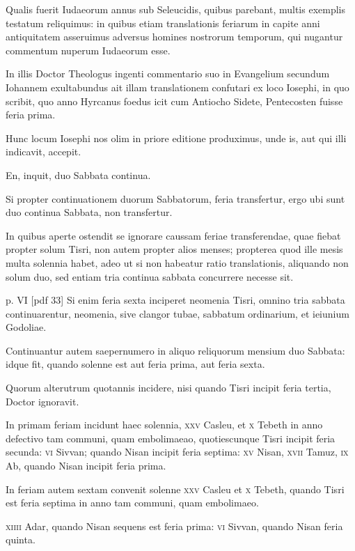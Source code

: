 \begin{parnumbers}
Qualis fuerit Iudaeorum annus sub Seleucidis, quibus parebant,
multis exemplis testatum reliquimus: in quibus etiam translationis
feriarum in capite anni antiquitatem asseruimus adversus homines
nostrorum temporum, qui nugantur commentum nuperum
Iudaeorum esse.

In illis Doctor Theologus ingenti commentario
suo in Evangelium secundum Iohannem exultabundus ait illam
translationem confutari ex loco Iosephi, in quo scribit, quo anno
Hyrcanus foedus icit cum Antiocho Sidete, Pentecosten fuisse feria
prima.

Hunc locum Iosephi nos olim in priore editione produximus,
unde is, aut qui illi indicavit, accepit.

En, inquit, duo Sabbata continua.

Si propter continuationem duorum Sabbatorum, feria transfertur,
ergo ubi sunt duo continua Sabbata, non transfertur. 

In quibus aperte ostendit se ignorare caussam feriae transferendae, quae fiebat
propter solum Tisri, non autem propter alios menses; propterea
quod ille mesis multa solennia habet, adeo ut si non habeatur
ratio translationis, aliquando non solum duo, sed entiam tria continua
sabbata concurrere necesse sit.

\clearpage
p. VI [pdf 33]
Si enim feria sexta inciperet
neomenia Tisri, omnino tria sabbata continuarentur, neomenia,
sive clangor tubae, sabbatum ordinarium, et ieiunium Godoliae.

Continuantur autem saepernumero in aliquo reliquorum mensium
duo Sabbata: idque fit, quando solenne est aut feria prima, aut feria
sexta.

Quorum alterutrum quotannis incidere, nisi quando Tisri
incipit feria tertia, Doctor ignoravit.

In primam feriam incidunt
haec solennia, \textsc{xxv} Casleu, et \textsc{x} Tebeth in anno defectivo tam
communi, quam embolimaeao, quotiescunque Tisri incipit feria secunda:
\textsc{vi} Sivvan; quando Nisan incipit feria septima:
\textsc{xv} Nisan, \textsc{xvii} Tamuz,
\textsc{ix} Ab, quando Nisan incipit feria prima.

In feriam autem sextam
convenit solenne \textsc{xxv} Casleu et
 \textsc{x} Tebeth, quando Tisri est feria
septima in anno tam communi, quam embolimaeo.

\textsc{xiiii} Adar, quando
Nisan sequens est feria prima: \textsc{vi} Sivvan, quando Nisan feria quinta.


\end{parnumbers}

